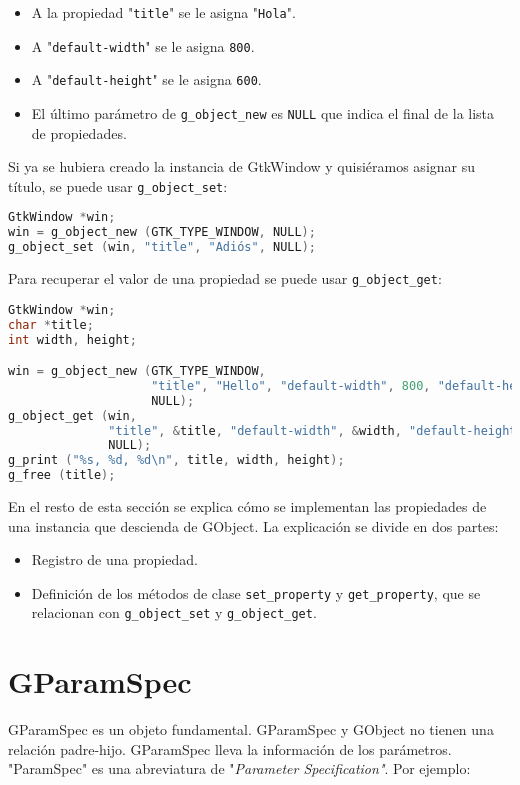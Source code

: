 \vspace{-\topsep}
\begin{itemize}
  \tightlist
\item A la propiedad "\texttt{title}" se le asigna "\texttt{Hola}".
\item A "\texttt{default-width}" se le asigna \texttt{800}.
\item A "\texttt{default-height}" se le asigna \texttt{600}.
\item El último parámetro de \texttt{g\_object\_new} es \texttt{NULL} que indica el
  final de la lista de propiedades.
\end{itemize}

Si ya se hubiera creado la instancia de \textsf{GtkWindow} y quisiéramos asignar su
título, se puede usar \texttt{g\_object\_set}:
\begin{lstlisting}[language=C]
GtkWindow *win;
win = g_object_new (GTK_TYPE_WINDOW, NULL);
g_object_set (win, "title", "Adiós", NULL);
\end{lstlisting}

Para recuperar el valor de una propiedad se puede usar \texttt{g\_object\_get}:

\begin{lstlisting}[language=C]
GtkWindow *win;
char *title;
int width, height;

win = g_object_new (GTK_TYPE_WINDOW,
                    "title", "Hello", "default-width", 800, "default-height", 600,
                    NULL);
g_object_get (win,
              "title", &title, "default-width", &width, "default-height", &height,
              NULL);
g_print ("%s, %d, %d\n", title, width, height);
g_free (title);
\end{lstlisting}

En el resto de esta sección se explica cómo se implementan las propiedades de una
instancia que descienda de \textsf{GObject}. La explicación se divide en dos partes:
\vspace{-\topsep}
\begin{itemize}
  \tightlist
\item Registro de una propiedad.
\item Definición de los métodos de clase \texttt{set\_property} y \texttt{get\_property},
  que se relacionan con \texttt{g\_object\_set} y \texttt{g\_object\_get}.
\end{itemize}

\section{\textsf{GParamSpec}}
\textsf{GParamSpec} es un objeto fundamental. \textsf{GParamSpec} y \textsf{GObject}
no tienen una relación padre-hijo. \textsf{GParamSpec} lleva la información de los
parámetros. \textsf{"ParamSpec"} es una abreviatura de "\emph{Parameter Specification"}.
Por ejemplo:

